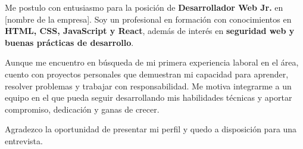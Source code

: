 \documentclass[11pt,a4paper,sans]{moderncv}
\date{\today}
\begin{document}
\makelettertitle

Me postulo con entusiasmo para la posición de \textbf{Desarrollador Web Jr.} en [nombre de la empresa].  
Soy un profesional en formación con conocimientos en \textbf{HTML, CSS, JavaScript y React}, además de interés en \textbf{seguridad web y buenas prácticas de desarrollo}.  

Aunque me encuentro en búsqueda de mi primera experiencia laboral en el área, cuento con proyectos personales que demuestran mi capacidad para aprender, resolver problemas y trabajar con responsabilidad.  
Me motiva integrarme a un equipo en el que pueda seguir desarrollando mis habilidades técnicas y aportar compromiso, dedicación y ganas de crecer.  

Agradezco la oportunidad de presentar mi perfil y quedo a disposición para una entrevista.  

\makeletterclosing
\end{document}
